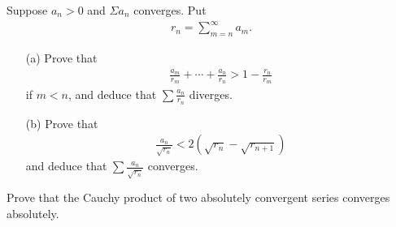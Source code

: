   \begin{exercise}[Rudin 3.12]
    Suppose $a_n > 0$ and $\Sigma a_n$ converges. Put
    \begin{align*}
      r_n = \sum_{m=n}^{\infty} a_m.
    \end{align*}
    \begin{enumerate} 
      \item[(a)] Prove that
      \begin{align*}
        \frac{a_m}{r_m} + \cdots + \frac{a_n}{r_n} > 1 - \frac{r_n}{r_m}
      \end{align*}
      if $m < n$, and deduce that $\sum \frac{a_n}{r_n}$ diverges.
      \item[(b)] Prove that
      \begin{align*}
        \frac{a_n}{\sqrt{r_n}} < 2(\sqrt{r_n} - \sqrt{r_{n+1}})
      \end{align*}
      and deduce that $\sum \frac{a_n}{\sqrt{r_n}}$ converges.
    \end{enumerate}
  \end{exercise}
  \begin{solution}
    
  \end{solution}

  \begin{exercise}[Rudin 3.13]
    Prove that the Cauchy product of two absolutely convergent series converges absolutely.
  \end{exercise}
  \begin{solution}
    
  \end{solution}

